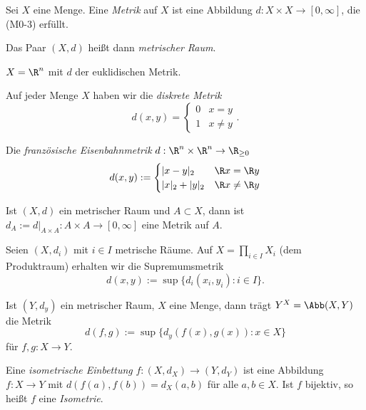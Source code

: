 \begin{df}
	Sei $X$ eine Menge.
	Eine \emph{Metrik} auf $X$ ist eine Abbildung $d : X \times X \to [0, \infty]$, die (M0-3) erfüllt.

	Das Paar $(X,d)$ heißt dann \emph{metrischer Raum}.
\end{df}

\begin{ex}
	$X = \R^n$ mit $d$ der euklidischen Metrik.
\end{ex}

\begin{ex}
	Auf jeder Menge $X$ haben wir die \emph{diskrete Metrik}
	\[
		d(x,y) = \begin{cases}
			0 & x=y \\
			1 & x\neq y
		\end{cases}.
	\]
\end{ex}

\begin{ex}
	Die \emph{französische Eisenbahnmetrik} $d: \R^n \times \R^n \to \R_{\ge 0}$
	\[
		d(x,y) := \begin{cases}
			|x-y|_2 & \R x = \R y \\
			|x|_2 + |y|_2 & \R x \neq \R y
		\end{cases}
	\]
\end{ex}

\begin{ex}[Teilräume]
	Ist $(X,d)$ ein metrischer Raum und $A \subset X$, dann ist $d_A := d\big|_{A\times A} : A \times A \to [0,\infty]$ eine Metrik auf $A$.
\end{ex}

\begin{ex}[Produkträume]
	Seien $(X,d_i)$ mit $i \in I$ metrische Räume.
	Auf $X = \prod_{i\in I} X_i$ (dem Produktraum) erhalten wir die Supremumsmetrik
	\[
		d(x,y) := \sup \{ d_i(x_i,y_i) : i \in I \}.
	\]
\end{ex}

\begin{ex}[Abbildungsräume]
	Ist $(Y,d_y)$ ein metrischer Raum, $X$ eine Menge, dann trägt $Y^X = \Abb(X,Y)$ die Metrik
	\[
		d(f,g) := \sup \{ d_y(f(x),g(x)) : x \in X \}
	\]
	für $f,g : X \to Y$.
\end{ex}

\begin{df}
	Eine \emph{isometrische Einbettung} $f:(X,d_X) \to (Y,d_Y)$ ist eine Abbildung $f: X\to Y$ mit $d(f(a), f(b)) = d_X(a,b)$ für alle $a,b \in X$.
	Ist $f$ bijektiv, so heißt $f$ eine \emph{Isometrie}.
\end{df}

